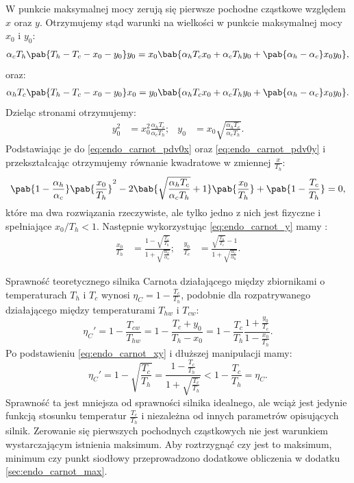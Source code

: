 W punkcie maksymalnej mocy zerują się pierwsze pochodne cząstkowe względem \(x\) oraz \(y\). Otrzymujemy stąd warunki na wielkości w punkcie maksymalnej mocy \(x_0\) i \(y_0\):
\begin{align}\label{eq:endo_carnot_pdv0x}
	\alpha_{c}T_{h}\pab{T_{h} - T_{c} - x_0 - y_0}y_0 = x_0\bab{\alpha_{h}T_{c}x_0 + \alpha_{c}T_{h}y_0 + \pab{\alpha_{h} - \alpha_{c}}x_0y_0},
\end{align}
oraz:
\begin{align}\label{eq:endo_carnot_pdv0y}
	\alpha_{h}T_{c}\pab{T_{h} - T_{c} - x_0 - y_0}x_0 = y_0\bab{\alpha_{h}T_{c}x_0 + \alpha_{c}T_{h}y_0 + \pab{\alpha_{h} - \alpha_{c}}x_0y_0}.
\end{align}
Dzieląc stronami otrzymujemy:
\begin{align}\label{eq:endo_carnot_y}
	y_0^2 &= x_0^2\frac{\alpha_{h}T_{c}}{\alpha_{c}T_{h}}; & 
	y_0 &= x_0\sqrt{\frac{\alpha_{h}T_{c}}{\alpha_{c}T_{h}}}.
\end{align}
Podstawiając je do \eqref{eq:endo_carnot_pdv0x} oraz \eqref{eq:endo_carnot_pdv0y} i przekształcając otrzymujemy równanie kwadratowe w zmiennej \(\frac{x}{T_{h}}\):
\begin{equation}
	\pab{1 - \frac{\alpha_{h}}{\alpha_{c}}}\pab{\frac{x_0}{T_{h}}}^2 - 2\bab{\sqrt{\frac{\alpha_{h}T_{c}}{\alpha_{c}T_{h}}} + 1}\pab{\frac{x_0}{T_{h}}} + \pab{1 - \frac{T_{c}}{T_{h}}} = 0,
\end{equation}
które ma dwa rozwiązania rzeczywiste, ale tylko jedno z nich jest fizyczne i spełniające \(x_0/T_{h} < 1\). Następnie wykorzystując \eqref{eq:endo_carnot_y} mamy \cite{curzon}:
\begin{align}\label{eq:endo_carnot_xy}
	\frac{x_0}{T_{h}} &= \frac{1 - \sqrt{\frac{T_{c}}{T_{h}}}}{1 + \sqrt{\frac{\alpha_{h}}{\alpha_{c}}}}; & 
	\frac{y_0}{T_{c}} &= \frac{\sqrt{\frac{T_{h}}{T_{c}}} - 1}{1 + \sqrt{\frac{\alpha_{c}}{\alpha_{h}}}}.
\end{align}

Sprawność teoretycznego silnika Carnota działającego między zbiornikami o temperaturach \(T_h\) i \(T_c\) wynosi \(\eta_C = 1 - \frac{T_{c}}{T_{h}}\), podobnie dla rozpatrywanego działającego między temperaturami \(T_{hw}\) i \(T_{cw}\):
\begin{equation}\label{eq:endo_carnot_eta_def}
	\eta_C' = 1 - \frac{T_{cw}}{T_{hw}} = 
	1 - \frac{T_{c} + y_0}{T_{h} - x_0} = 
	1 - \frac{T_{c}}{T_{h}}\frac{1 + \frac{y_0}{T_{c}}}{1 - \frac{x_0}{T_{h}}}.
\end{equation}
Po podstawieniu \eqref{eq:endo_carnot_xy} i dłuższej manipulacji mamy:
\begin{equation}\label{eq:endo_carnot_eta}
	\eta_C' = 1 - \sqrt{\frac{T_{c}}{T_{h}}} = \frac{1 - \frac{T_{c}}{T_{h}}}{1 + \sqrt{\frac{T_{c}}{T_{h}}}} < 
	1 - \frac{T_{c}}{T_{h}} = \eta_C.
\end{equation}
Sprawność ta jest mniejsza od sprawności silnika idealnego, ale wciąż jest jedynie funkcją stosunku temperatur \(\frac{T_{c}}{T_{h}}\) i niezależna od innych parametrów opisujących silnik. Zerowanie się pierwszych pochodnych cząstkowych nie jest warunkiem wystarczającym istnienia maksimum. Aby roztrzygnąć czy jest to maksimum, minimum czy punkt siodłowy przeprowadzono dodatkowe obliczenia w dodatku \ref{sec:endo_carnot_max}.

